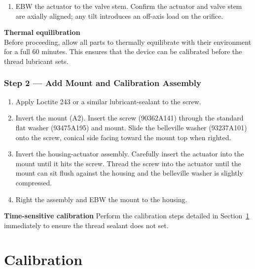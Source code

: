 \documentclass[12pt, letterpaper]{report}%
\newcounter{mycounter}           %
\newcounter{sub}[mycounter]      %
\begin{document}
\begin{appendices}
	\begin{enumerate}[itemsep=4pt]
		\item EBW the actuator to the valve stem.
					Confirm the actuator and valve stem are axially
					aligned; any tilt introduces an off-axis load on the orifice.
	\end{enumerate}

	\begin{notebox}
	\textbf{Thermal equilibration}\\
	Before proceeding, allow all parts to thermally equilibrate with their environment for a full
	60 minutes. This ensures that the device can be calibrated before the thread lubricant sets.
	\end{notebox}

	\subsubsection{Step 2 --- Add Mount and Calibration Assembly}

	\begin{enumerate}[itemsep=4pt]
		\item Apply Loctite 243 or a similar lubricant-sealant to the screw.
		\item Invert the mount (A2). Insert the screw (90362A141) through the
					standard flat washer (93475A195) and mount.
					Slide the belleville washer (93237A101) onto the screw,
					conical side facing toward the mount top when righted.
		\item Invert the housing-actuator assembly. Carefully insert the actuator into
					the mount until it hits the screw. Thread the screw into the actuator until the mount
					can sit flush against the housing and the belleville washer is slightly compressed.
		\item Right the assembly and EBW the mount to the housing.
	\end{enumerate}

	\begin{notebox}
	\textbf{Time-sensitive calibration}
	Perform the calibration steps detailed in Section~\ref{sec:calibration} immediately
	to ensure the thread sealant does not set.
	\end{notebox}

	\section{Calibration}
	\label{sec:calibration}


\end{appendices}
\end{document}
